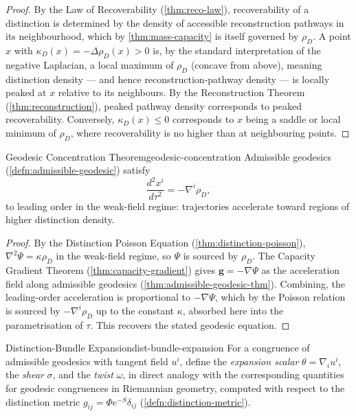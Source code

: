 \documentclass[12pt,twoside,openright]{book}
\begin{document}
\begin{proof}
  By the Law of Recoverability (\cref{thm:reco-law}),
  recoverability of a distinction is determined by the
  density of accessible reconstruction pathways in its
  neighbourhood, which by \cref{thm:mass-capacity} is itself
  governed by $\rho_D$. A point $x$ with $\kappa_D(x) =
  -\Delta\rho_D(x) > 0$ is, by the standard interpretation of
  the negative Laplacian, a local maximum of $\rho_D$
  (concave from above), meaning distinction density --- and
  hence reconstruction-pathway density --- is locally
  peaked at $x$ relative to its neighbours. By the
  Reconstruction Theorem (\cref{thm:reconstruction}), peaked
  pathway density corresponds to peaked recoverability.
  Conversely, $\kappa_D(x) \le 0$ corresponds to $x$ being a
  saddle or local minimum of $\rho_D$, where recoverability
  is no higher than at neighbouring points.
\end{proof}

\begin{theorem}{Geodesic Concentration Theorem}{geodesic-concentration}
  Admissible geodesics (\cref{defn:admissible-geodesic})
  satisfy
  \[
    \frac{d^2 x^i}{d\tau^2} = -\nabla^i \rho_D,
  \]
  to leading order in the weak-field regime: trajectories
  accelerate toward regions of higher distinction density.
\end{theorem}

\begin{proof}
  By the Distinction Poisson Equation
  (\cref{thm:distinction-poisson}), $\nabla^2\Psi =
  \kappa\rho_D$ in the weak-field regime, so
  $\Psi$ is sourced by $\rho_D$. The Capacity Gradient
  Theorem (\cref{thm:capacity-gradient}) gives
  $\mathbf{g} = -\nabla\Psi$ as the acceleration field along
  admissible geodesics (\cref{thm:admissible-geodesic-thm}).
  Combining, the leading-order acceleration is proportional
  to $-\nabla\Psi$, which by the Poisson relation is sourced
  by $-\nabla^i\rho_D$ up to the constant $\kappa$, absorbed
  here into the parametrisation of $\tau$. This recovers the
  stated geodesic equation.
\end{proof}

\begin{definition}{Distinction-Bundle Expansion}{dist-bundle-expansion}
  For a congruence of admissible geodesics with tangent
  field $u^i$, define the \emph{expansion scalar}
  $\theta = \nabla_i u^i$, the \emph{shear} $\sigma$, and the
  \emph{twist} $\omega$, in direct analogy with the
  corresponding quantities for geodesic congruences in
  Riemannian geometry, computed with respect to the
  distinction metric $g_{ij} = \Phi e^{-S}\delta_{ij}$
  (\cref{defn:distinction-metric}).
\end{definition}
\end{document}
